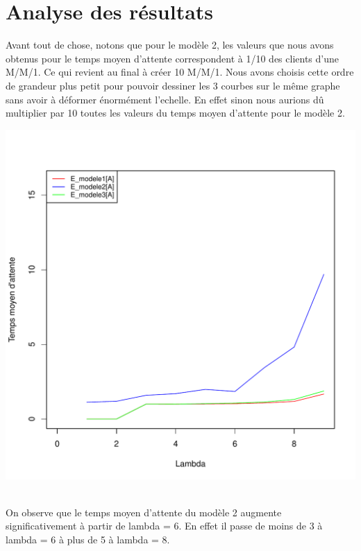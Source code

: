 \documentclass[a4paper,11pt]{article}
\begin{document}
\section{Analyse des résultats}
	Avant tout de chose, notons que pour le modèle 2, les valeurs que nous avons obtenus pour le temps moyen d'attente
	correspondent à 1/10 des clients d'une M/M/1. Ce qui revient au final à créer 10 M/M/1. Nous avons choisis cette ordre de grandeur
	plus petit pour pouvoir dessiner les 3 courbes sur le même graphe sans avoir à déformer énormément l'echelle. En effet sinon nous aurions dû 
	multiplier par 10 toutes les valeurs du temps moyen d'attente pour le modèle 2.\\
	\centerline{\includegraphics[scale=0.8]{E[A].pdf}}\\
	On observe que le temps moyen d'attente du modèle 2 augmente significativement à partir de lambda = 6. En effet il passe de moins de 3 à lambda = 6 à plus de 5 à lambda = 8.
	
\end{document}
